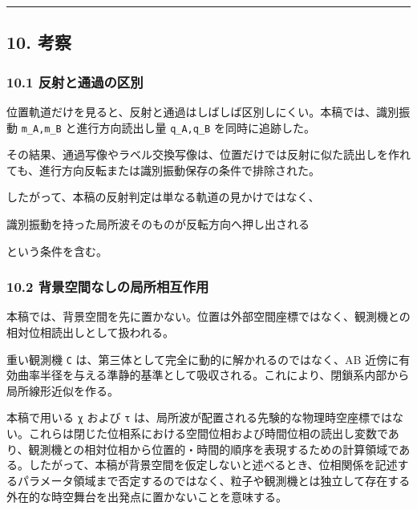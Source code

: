 \documentclass[
  a4paper,
]{article}
\newenvironment{Shaded}{}{}
\newcommand{\NormalTok}[1]{#1}
\begin{document}
\begin{center}\rule{0.5\linewidth}{0.5pt}\end{center}

\subsection{10. 考察}\label{ux8003ux5bdf}

\subsubsection{10.1
反射と通過の区別}\label{ux53cdux5c04ux3068ux901aux904eux306eux533aux5225}

位置軌道だけを見ると、反射と通過はしばしば区別しにくい。本稿では、識別振動
\texttt{m\_A,m\_B} と進行方向読出し量 \texttt{q\_A,q\_B}
を同時に追跡した。

その結果、通過写像やラベル交換写像は、位置だけでは反射に似た読出しを作れても、進行方向反転または識別振動保存の条件で排除された。

したがって、本稿の反射判定は単なる軌道の見かけではなく、

\begin{Shaded}
\begin{Highlighting}[]
\NormalTok{識別振動を持った局所波そのものが反転方向へ押し出される}
\end{Highlighting}
\end{Shaded}

という条件を含む。

\subsubsection{10.2
背景空間なしの局所相互作用}\label{ux80ccux666fux7a7aux9593ux306aux3057ux306eux5c40ux6240ux76f8ux4e92ux4f5cux7528}

本稿では、背景空間を先に置かない。位置は外部空間座標ではなく、観測機との相対位相読出しとして扱われる。

重い観測機 \texttt{C} は、第三体として完全に動的に解かれるのではなく、AB
近傍に有効曲率半径を与える準静的基準として吸収される。これにより、閉鎖系内部から局所線形近似を作る。

本稿で用いる \texttt{χ} および \texttt{τ}
は、局所波が配置される先験的な物理時空座標ではない。これらは閉じた位相系における空間位相および時間位相の読出し変数であり、観測機との相対位相から位置的・時間的順序を表現するための計算領域である。したがって、本稿が背景空間を仮定しないと述べるとき、位相関係を記述するパラメータ領域まで否定するのではなく、粒子や観測機とは独立して存在する外在的な時空舞台を出発点に置かないことを意味する。
\end{document}
